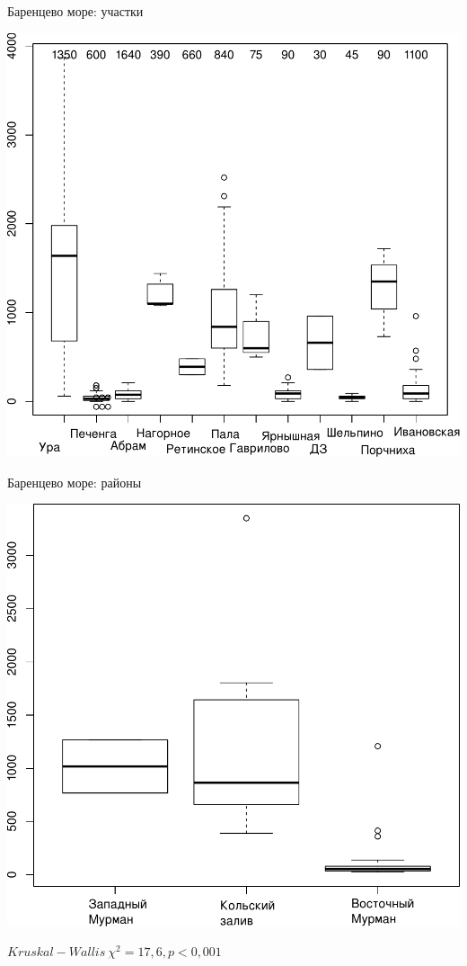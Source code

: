 \documentclass{beamer}
\begin{document}
\begin{frame}{Баренцево море: участки}
 \begin{center}
		\includegraphics[width=.8\textwidth]{N2_area_Barents1.pdf}
 \end{center}
\end{frame}

\begin{frame}{Баренцево море: районы}
 \begin{center}
		\includegraphics[width=.7\textwidth]{Nmean_region_Barents1.pdf}
 \end{center}
$Kruskal-Wallis\ \chi^2 = 17,6, p < 0,001$
\end{frame}
\end{document}
